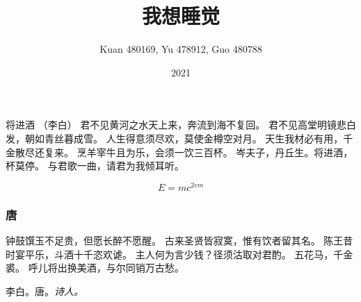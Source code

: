 \documentclass[14pt,draft]{beamer}
\title{我想睡觉}
\author{Kuan 480169, Yu 478912, Guo 480788}
\institute{我爱我家}
\date{2021}
\begin{document}
\frame{\titlepage}

\begin{frame}
将进酒 （李白）
君不见黄河之水天上来，奔流到海不复回。
君不见高堂明镜悲白发，朝如青丝暮成雪。
人生得意须尽欢，莫使金樽空对月。
天生我材必有用，千金散尽还复来。
烹羊宰牛且为乐，会须一饮三百杯。
岑夫子，丹丘生。将进酒，杯莫停。
与君歌一曲，请君为我倾耳听。
\end{frame}
\begin{frame}
  \[ E = mc^{2em}\]
\end{frame}
\begin{frame}
\frametitle{唐}
钟鼓馔玉不足贵，但愿长醉不愿醒。
古来圣贤皆寂寞，惟有饮者留其名。
陈王昔时宴平乐，斗酒十千恣欢谑。
主人何为言少钱？径须沽取对君酌。
五花马，千金裘。
呼儿将出换美酒，与尔同销万古愁。

  李白。唐。\emph{诗人。}
\end{frame}
\end{document}
